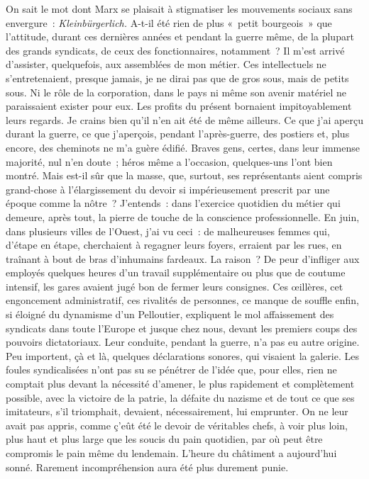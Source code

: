 \documentclass[french,twoside]{book} %
\begin{document}
On sait le mot dont Marx se plaisait à stigmatiser les mouvements sociaux sans envergure : \emph{Kleinbürgerlich.} A-t-il été rien de plus « petit bourgeois » que l’attitude, durant ces dernières années et pendant la guerre même, de la plupart des grands syndicats, de ceux des fonctionnaires, notamment ? Il m’est arrivé d’assister, quelquefois, aux assemblées de mon métier. Ces intellectuels ne s’entretenaient, presque jamais, je ne dirai pas que de gros sous, mais de petits sous. Ni le rôle de la corporation, dans le pays ni même son avenir matériel ne paraissaient exister pour eux. Les profits du présent bornaient impitoyablement leurs regards. Je crains bien qu’il n’en ait été de même ailleurs. Ce que j’ai aperçu durant la guerre, ce que j’aperçois, pendant l’après-guerre, des postiers et, plus encore, des cheminots ne m’a guère édifié. Braves gens, certes, dans leur immense majorité, nul n’en doute ; héros même a l’occasion, quelques-uns l’ont bien montré. Mais est-il sûr que la masse, que, surtout, ses représentants aient compris grand-chose à l’élargissement du devoir si impérieusement prescrit par une époque comme la nôtre ? J’entends : dans l’exercice quotidien du métier qui demeure, après tout, la pierre de touche de la conscience professionnelle. En juin, dans plusieurs villes de l’Ouest, j’ai vu ceci : de   malheureuses femmes qui, d’étape en étape, cherchaient à regagner leurs foyers, erraient par les rues, en traînant à bout de bras d’inhumains fardeaux. La raison ? De peur d’infliger aux employés quelques heures d’un travail supplémentaire ou plus que de coutume intensif, les gares avaient jugé bon de fermer leurs consignes. Ces œillères, cet engoncement administratif, ces rivalités de personnes, ce manque de souffle enfin, si éloigné du dynamisme d’un Pelloutier, expliquent le mol affaissement des syndicats dans toute l’Europe et jusque chez nous, devant les premiers coups des pouvoirs dictatoriaux. Leur conduite, pendant la guerre, n’a pas eu autre origine. Peu importent, çà et là, quelques déclarations sonores, qui visaient la galerie. Les foules syndicalisées n’ont pas su se pénétrer de l’idée que, pour elles, rien ne comptait plus devant la nécessité d’amener, le plus rapidement et complètement possible, avec la victoire de la patrie, la défaite du nazisme et de tout ce que ses imitateurs, s’il triomphait, devaient, nécessairement, lui emprunter. On ne leur avait pas appris, comme ç’eût été le devoir de véritables chefs, à voir plus loin, plus haut et plus large que les soucis du pain quotidien, par où peut être compromis le pain même du lendemain. L’heure du châtiment a aujourd’hui sonné. Rarement incompréhension aura été plus durement punie.\par
\end{document}
